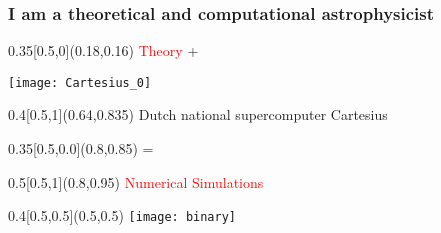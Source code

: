 \documentclass[xcolor=dvipsnames,professionalfonts, aspectratio=169]{beamer}
\begin{document}
\begin{frame}

  \frametitle{I am a theoretical and computational astrophysicist}
  \centering
  \begin{textblock}{0.35}[0.5,0](0.18,0.16)
    \Large  \textcolor{red}{Theory} +
  \end{textblock}

  \texttt{[image: Cartesius\_0]}\\
  \begin{textblock}{0.4}[0.5,1](0.64,0.835)
    \color{black} \tiny Dutch national supercomputer Cartesius
  \end{textblock}

  \begin{textblock}{0.35}[0.5,0.0](0.8,0.85)
    \Large =
  \end{textblock}

  \begin{textblock}{0.5}[0.5,1](0.8,0.95)
    \textcolor{red}{ \Large Numerical Simulations\phantom{A}}
  \end{textblock}


  \begin{textblock}{0.4}[0.5,0.5](0.5,0.5)
    \texttt{[image: binary]}
  \end{textblock}

\end{frame}
\end{document}
